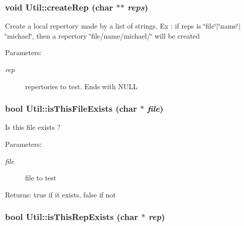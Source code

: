 \subsubsection{\setlength{\rightskip}{0pt plus 5cm}void Util::createRep (char $\ast$$\ast$ {\em reps})\hspace{0.3cm}{\tt  [static]}}\label{classUtil_bc971ff30f2665d749c4986a952f30e8}


Create a local repertory made by a list of strings. Ex : if reps is \char`\"{}file\char`\"{}$|$\char`\"{}name\char`\"{}$|$\char`\"{}michael\char`\"{}, then a repertory \char`\"{}file/name/michael/\char`\"{} will be created \begin{Desc}
\item[Parameters:]
\begin{description}
\item[{\em rep}]repertories to test. Ends with NULL \end{description}
\end{Desc}
\subsubsection{\setlength{\rightskip}{0pt plus 5cm}bool Util::isThisFileExists (char $\ast$ {\em file})\hspace{0.3cm}{\tt  [static]}}\label{classUtil_891989bed9b632c0dc28834b8787bd9f}


Is this file exists ? \begin{Desc}
\item[Parameters:]
\begin{description}
\item[{\em file}]file to test \end{description}
\end{Desc}
\begin{Desc}
\item[Returns:]true if it exists, false if not \end{Desc}
\subsubsection{\setlength{\rightskip}{0pt plus 5cm}bool Util::isThisRepExists (char $\ast$ {\em rep})\hspace{0.3cm}{\tt  [static]}}\label{classUtil_5e4c6ac30a41e8533bd7fc223d6e4a67}


